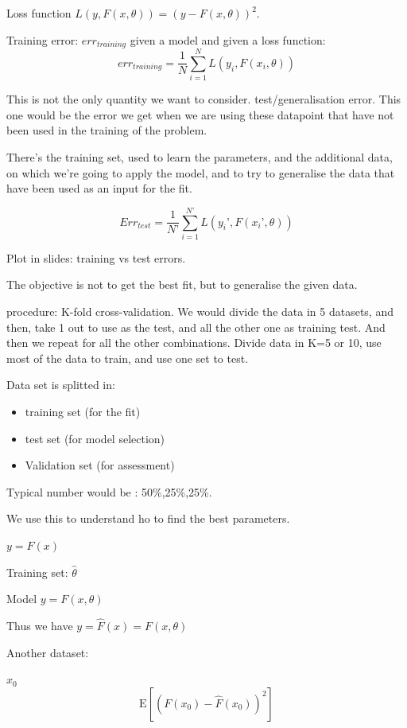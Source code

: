 \documentclass[a4paper]{tufte-book}
\newcommand{\E}{\mathrm{E}}
\begin{document}
Loss function $L (y, F(x, \theta)) = (y-F(x,\theta))^2$.

Training error: $err_{training}$ given a model and given a loss function:
\begin{equation}
err_{training} = \frac{1}{N} \sum_{i=1}^N L (y_i, F(x_i,\theta))
\end{equation}

This is not the only quantity we want to consider.
test/generalisation error. This one would be the error we get when we are using these datapoint that have not been used in the training of the problem.

There’s the training set, used to learn the parameters, and the additional data, on which we’re going to apply the model, and to try to generalise the data that have been used as an input for the fit.

\begin{equation}
Err_{test} = \frac{1}{N’} \sum_{i=1}^{N’} L(y_i’,F(x_i’,\theta))
\end{equation}

Plot in slides: training vs test errors.

The objective is not to get the best fit, but to generalise the given data.

procedure: K-fold cross-validation. 
We would divide the data in 5 datasets, and then, take 1 out to use as the test, and all the other one as training test. 
And then we repeat for all the other combinations. Divide data in K=5 or 10, use most of the data to train, and use one set to test.

Data set is splitted in:
\begin{itemize}
\item training set (for the fit)
\item test set (for model selection)
\item Validation set (for assessment)
\end{itemize}

Typical number would be : 50\%,25\%,25\%.

We use this to understand ho to find the best parameters.

$y=F(x)$

Training set: $\hat{\theta}$

Model $y=F(x,\theta)$

Thus we have $y= \hat{F}(x) = F(x,\theta)$

Another dataset:

$x_0$
\begin{equation}
\E [(F(x_0) - \hat{F}(x_0) )^2]
\end{equation}
\end{document}
